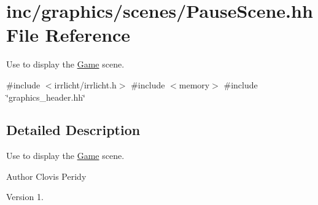 \hypertarget{PauseScene_8hh}{}\section{inc/graphics/scenes/\+Pause\+Scene.hh File Reference}
\label{PauseScene_8hh}


Use to display the \hyperlink{classGame}{Game} scene.  


{\ttfamily \#include $<$irrlicht/irrlicht.\+h$>$}\newline
{\ttfamily \#include $<$memory$>$}\newline
{\ttfamily \#include \char`\"{}graphics\+\_\+header.\+hh\char`\"{}}\newline


\subsection{Detailed Description}
Use to display the \hyperlink{classGame}{Game} scene. 

\begin{DoxyAuthor}{Author}
Clovis Peridy 
\end{DoxyAuthor}
\begin{DoxyVersion}{Version}
1. 
\end{DoxyVersion}
